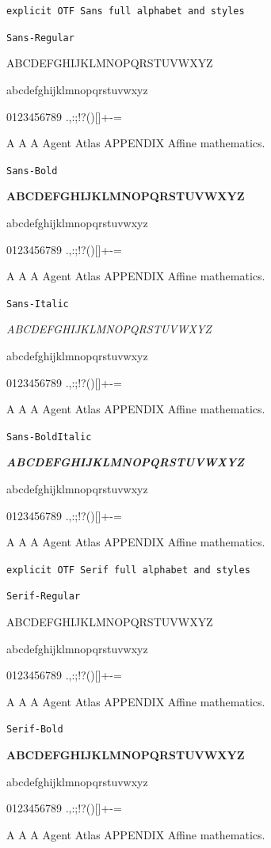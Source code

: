 \documentclass[12pt]{article}
\begin{document}
\texttt{explicit OTF Sans full alphabet and styles}\par
\texttt{Sans-Regular}\par
{\SansFont\fontsize{13}{17}\selectfont ABCDEFGHIJKLMNOPQRSTUVWXYZ\par abcdefghijklmnopqrstuvwxyz\par 0123456789 .,:;!?()[]+-=\par A A A Agent Atlas APPENDIX Affine mathematics.\par}
\texttt{Sans-Bold}\par
{\SansFont\bfseries\fontsize{13}{17}\selectfont ABCDEFGHIJKLMNOPQRSTUVWXYZ\par abcdefghijklmnopqrstuvwxyz\par 0123456789 .,:;!?()[]+-=\par A A A Agent Atlas APPENDIX Affine mathematics.\par}
\texttt{Sans-Italic}\par
{\SansFont\itshape\fontsize{13}{17}\selectfont ABCDEFGHIJKLMNOPQRSTUVWXYZ\par abcdefghijklmnopqrstuvwxyz\par 0123456789 .,:;!?()[]+-=\par A A A Agent Atlas APPENDIX Affine mathematics.\par}
\texttt{Sans-BoldItalic}\par
{\SansFont\bfseries\itshape\fontsize{13}{17}\selectfont ABCDEFGHIJKLMNOPQRSTUVWXYZ\par abcdefghijklmnopqrstuvwxyz\par 0123456789 .,:;!?()[]+-=\par A A A Agent Atlas APPENDIX Affine mathematics.\par}
\newpage
\texttt{explicit OTF Serif full alphabet and styles}\par
\texttt{Serif-Regular}\par
{\rmfamily\fontsize{13}{17}\selectfont ABCDEFGHIJKLMNOPQRSTUVWXYZ\par abcdefghijklmnopqrstuvwxyz\par 0123456789 .,:;!?()[]+-=\par A A A Agent Atlas APPENDIX Affine mathematics.\par}
\texttt{Serif-Bold}\par
{\rmfamily\bfseries\fontsize{13}{17}\selectfont ABCDEFGHIJKLMNOPQRSTUVWXYZ\par abcdefghijklmnopqrstuvwxyz\par 0123456789 .,:;!?()[]+-=\par A A A Agent Atlas APPENDIX Affine mathematics.\par}
\end{document}
